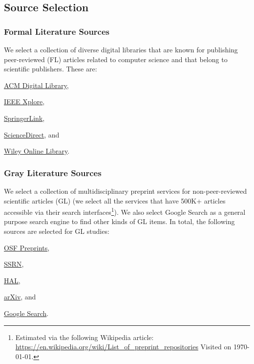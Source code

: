 \documentclass[review]{elsarticle}
\begin{document}
\subsection{Source Selection}
\subsubsection{Formal Literature Sources}
We select a collection of diverse digital libraries that are known for publishing peer-reviewed (FL) articles related to computer science and that belong to scientific publishers.
These are:
\begin{inparaenum}[(i)]
	\item \href{https://dl.acm.org/}{ACM Digital Library},
	\item \href{https://ieeexplore.ieee.org/Xplore/home.jsp}{IEEE Xplore},
	\item \href{https://link.springer.com/}{SpringerLink},
	\item \href{https://www.sciencedirect.com/}{ScienceDirect}, and
	\item \href{https://onlinelibrary.wiley.com/}{Wiley Online Library}.
\end{inparaenum}

\subsubsection{Gray Literature Sources}
We select a collection of multidisciplinary preprint services for non-peer-reviewed scientific articles (GL) (we select all the services that have 500K+ articles accessible via their search interfaces\footnote{Estimated via the following Wikipedia article: \url{https://en.wikipedia.org/wiki/List_of_preprint_repositories} Visited on \today.}).
We also select Google Search as a general purpose search engine to find other kinds of GL items.
In total, the following sources are selected for GL studies:
\begin{inparaenum}[(i)]
	\item \href{https://osf.io/preprints/}{OSF Preprints},
	\item \href{https://papers.ssrn.com/sol3/DisplayAbstractSearch.cfm}{SSRN},
	\item \href{https://hal.archives-ouvertes.fr/}{HAL},
	\item \href{https://arxiv.org/}{arXiv}, and
	\item \href{https://google.com}{Google Search}.
\end{inparaenum}
\end{document}
